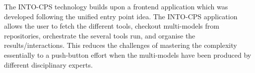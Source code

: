 
The INTO-CPS technology builds upon a frontend application which was developed following the
unified entry point idea.  The INTO-CPS application allows the user to fetch
the different tools, checkout multi-models from repositories, orchestrate the
several tools run, and organise the results/interactions.  This reduces the
challenges of mastering the complexity essentially to a push-button effort when the multi-models have been produced by different disciplinary experts.
 


